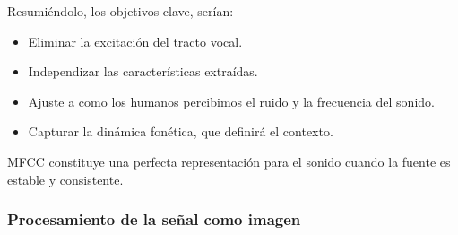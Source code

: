 \documentclass[11pt,a4paper,spanish]{book}
\begin{document}
	Resumiéndolo, los objetivos clave, serían:
	\begin{itemize}
		\item Eliminar la excitación del tracto vocal.
		\item Independizar las características extraídas.
		\item Ajuste a como los humanos percibimos el ruido y la frecuencia del sonido.
		\item Capturar la dinámica fonética, que definirá el contexto.
	\end{itemize}
	
	MFCC constituye una perfecta representación para el sonido cuando la fuente es estable y consistente. 
	

	\subsubsection{Procesamiento de la señal como imagen}

	
\end{document}
